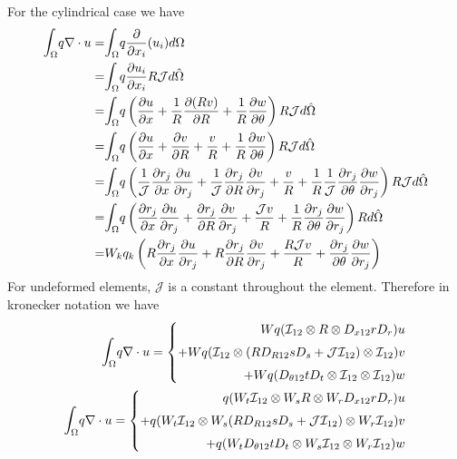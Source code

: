 \documentclass{kthreport}
\begin{document}
For the cylindrical case we have
\begin{eqnarray}
	\mathlarger\int_{\Omega} q\nabla\cdot u  = & \mathlarger\int_{\Omega} q\dfrac{\partial }{\partial x_{i}}(u_{i}) d\Omega \nonumber \\
	= & \mathlarger\int_{\Omega} q\dfrac{\partial u_{i}}{\partial x_{i}} R \mathcal{J} d\hat{\Omega} \nonumber \\
	= & \mathlarger\int_{\Omega} q\left(\dfrac{\partial u}{\partial x} + \dfrac{1}{R}\dfrac{\partial (Rv)}{\partial R} + \dfrac{1}{R}\dfrac{\partial w}{\partial \theta} \right) R \mathcal{J} d\hat{\Omega} \nonumber \\
	= & \mathlarger\int_{\Omega} q\left(\dfrac{\partial u}{\partial x} + \dfrac{\partial v}{\partial R} + \dfrac{v}{R}+ \dfrac{1}{R}\dfrac{\partial w}{\partial \theta} \right) R \mathcal{J} d\hat{\Omega} \nonumber \\
	= & \mathlarger\int_{\Omega} q\left(\dfrac{1}{\mathcal{J}}\dfrac{\partial r_{j}}{\partial x}\dfrac{\partial u}{\partial r_{j}} + \dfrac{1}{\mathcal{J}}\dfrac{\partial r_{j}}{\partial R}\dfrac{\partial v}{\partial r_{j}} + \dfrac{v}{R} + \dfrac{1}{R}\dfrac{1}{\mathcal{J}}\dfrac{\partial r_{j}}{\partial \theta}\dfrac{\partial w}{\partial r_{j}} \right) R \mathcal{J} d\hat{\Omega} \nonumber \\
	= & \mathlarger\int_{\Omega} q\left(\dfrac{\partial r_{j}}{\partial x}\dfrac{\partial u}{\partial r_{j}} + \dfrac{\partial r_{j}}{\partial R}\dfrac{\partial v}{\partial r_{j}} + \dfrac{\mathcal{J}v}{R} + \dfrac{1}{R}\dfrac{\partial r_{j}}{\partial \theta}\dfrac{\partial w}{\partial r_{j}} \right) R  d\hat{\Omega} \nonumber \\	
	= &  W_{k}q_{k}\left(R\dfrac{\partial r_{j}}{\partial x}\dfrac{\partial u}{\partial r_{j}} + R\dfrac{\partial r_{j}}{\partial R}\dfrac{\partial v}{\partial r_{j}} + \dfrac{R\mathcal{J}v}{R} + \dfrac{\partial r_{j}}{\partial \theta}\dfrac{\partial w}{\partial r_{j}} \right) 
\end{eqnarray}
For undeformed elements, $\mathcal{J}$ is a constant throughout the element. Therefore in kronecker notation we have
\begin{eqnarray}
	\mathlarger\int_{\Omega} q\nabla\cdot u  = \left\{
		\begin{split}
			Wq(\mathcal{I}_{12}\otimes R\otimes D_{x12}rD_{r})u \\
			+ Wq(\mathcal{I}_{12}\otimes (RD_{R12}sD_{s} + \mathcal{J}\mathcal{I}_{12})\otimes \mathcal{I}_{12})v \\
			+ Wq(D_{\theta12}tD_{t}\otimes \mathcal{I}_{12}\otimes \mathcal{I}_{12})w
		\end{split}\right. \\
	\mathlarger\int_{\Omega} q\nabla\cdot u  = \left\{
\begin{split}
	q(W_{t}\mathcal{I}_{12}\otimes W_{s}R\otimes W_{r}D_{x12}rD_{r})u \\
	+ q(W_{t}\mathcal{I}_{12}\otimes W_{s}(RD_{R12}sD_{s} + \mathcal{J}\mathcal{I}_{12})\otimes W_{r}\mathcal{I}_{12})v \\
	+ q(W_{t}D_{\theta12}tD_{t}\otimes W_{s}\mathcal{I}_{12}\otimes W_{r}\mathcal{I}_{12})w
\end{split}\right.	
\end{eqnarray}
\end{document}
